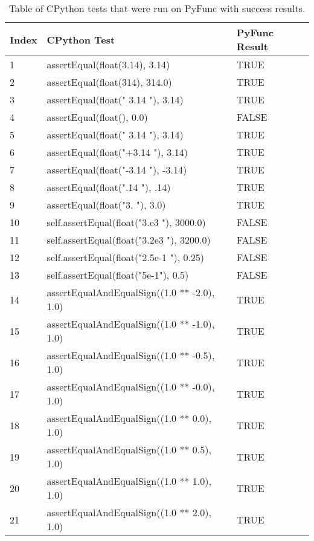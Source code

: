 \documentclass{l4proj}
\begin{document}
\begin{appendices}
\begin{table}[H]
    \centering
    \begin{tabular}{|l|l|l|}
    \hline
        Index & CPython Test  & PyFunc Result \\ \hline
        1 & assertEqual(float(3.14), 3.14)  & TRUE \\ \hline
        2 & assertEqual(float(314), 314.0) & TRUE \\ \hline
        3 & assertEqual(float("  3.14  "), 3.14)  & TRUE \\ \hline
        4 & assertEqual(float(), 0.0) & FALSE \\ \hline
        5 & assertEqual(float("  3.14  "), 3.14)  & TRUE \\ \hline
        6 & assertEqual(float("+3.14  "), 3.14)  & TRUE \\ \hline
        7 & assertEqual(float("-3.14  "), -3.14)  & TRUE \\ \hline
        8 & assertEqual(float(".14  "), .14)  & TRUE \\ \hline
        9 & assertEqual(float("3.  "), 3.0)  & TRUE \\ \hline
        10 & self.assertEqual(float("3.e3  "), 3000.0)  & FALSE \\ \hline
        11 & self.assertEqual(float("3.2e3  "), 3200.0)  & FALSE \\ \hline
        12 & self.assertEqual(float("2.5e-1  "), 0.25)  & FALSE \\ \hline
        13 & self.assertEqual(float("5e-1"), 0.5) & FALSE \\ \hline
        14 & assertEqualAndEqualSign((1.0 ** -2.0), 1.0)  & TRUE \\ \hline
        15 & assertEqualAndEqualSign((1.0 ** -1.0), 1.0)  & TRUE \\ \hline
        16 & assertEqualAndEqualSign((1.0 ** -0.5), 1.0)  & TRUE \\ \hline
        17 & assertEqualAndEqualSign((1.0 ** -0.0), 1.0)  & TRUE \\ \hline
        18 & assertEqualAndEqualSign((1.0 ** 0.0), 1.0)  & TRUE \\ \hline
        19 & assertEqualAndEqualSign((1.0 ** 0.5), 1.0)  & TRUE \\ \hline
        20 & assertEqualAndEqualSign((1.0 ** 1.0), 1.0)  & TRUE \\ \hline
        21 & assertEqualAndEqualSign((1.0 ** 2.0), 1.0)  & TRUE \\ \hline
    \end{tabular}
    \caption{Table of CPython tests that were run on PyFunc with success results.}
    \label{tbl:eval-floats}
\end{table}

\end{appendices}






\end{document}
